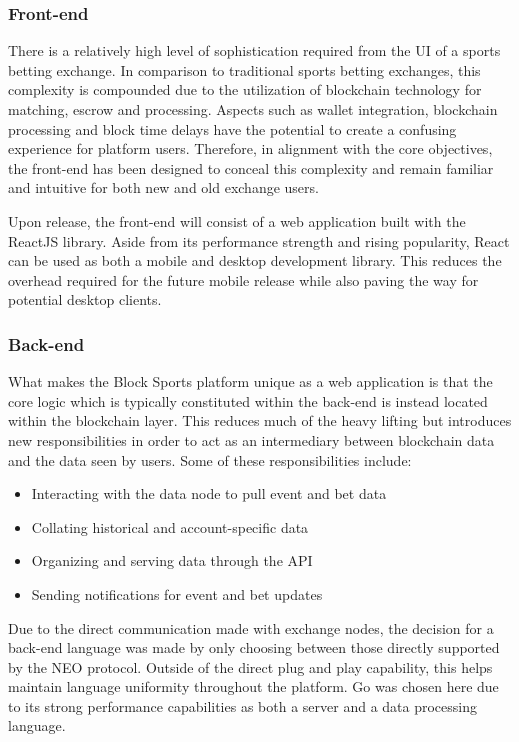 \documentclass{article}
\begin{document}
		\subsubsection{Front-end}
There is a relatively high level of sophistication required from the UI of a sports betting exchange. In comparison to traditional sports betting exchanges, this complexity is compounded due to the utilization of blockchain technology for matching, escrow and processing. Aspects such as wallet integration, blockchain processing and block time delays have the potential to create a confusing experience for platform users. Therefore, in alignment with the core objectives, the front-end has been designed to conceal this complexity and remain familiar and intuitive for both new and old exchange users.

Upon release, the front-end will consist of a web application built with the ReactJS library. Aside from its performance strength and rising popularity, React can be used as both a mobile and desktop development library. This reduces the overhead required for the future mobile release while also paving the way for potential desktop clients.

		\subsubsection{Back-end}
What makes the Block Sports platform unique as a web application is that the core logic which is typically constituted within the back-end is instead located within the blockchain layer. This reduces much  of the heavy lifting but introduces new responsibilities in order to act as an intermediary between blockchain data and the data seen by users. Some of these responsibilities include:

\begin{itemize}
	\item Interacting with the data node to pull event and bet data
	\item Collating historical and account-specific data
	\item Organizing and serving data through the API
	\item Sending notifications for event and bet updates
\end{itemize}

Due to the direct communication made with exchange nodes, the decision for a back-end language was made by only choosing between those directly supported by the NEO protocol. Outside of the direct plug and play capability, this helps maintain language uniformity throughout the platform. Go was chosen here due to its strong performance capabilities as both a server and a data processing language.
\end{document}
